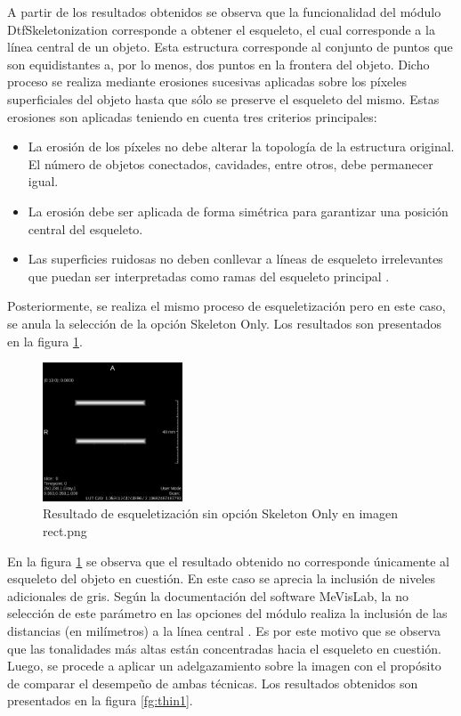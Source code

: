 \documentclass{article}
\begin{document}
A partir de los resultados obtenidos se observa que la funcionalidad del m\'{o}dulo DtfSkeletonization corresponde a obtener el esqueleto, el cual corresponde a la l\'{i}nea central de un objeto. Esta estructura corresponde al conjunto de puntos que son equidistantes a, por lo menos, dos puntos en la frontera del objeto. Dicho proceso se realiza mediante erosiones sucesivas aplicadas sobre los p\'{i}xeles superficiales del objeto hasta que s\'{o}lo se preserve el esqueleto del mismo. Estas erosiones son aplicadas teniendo en cuenta tres criterios principales:
\begin{itemize}
    \item La erosi\'{o}n de los p\'{i}xeles no debe alterar la topolog\'{i}a de la estructura original. El n\'{u}mero de objetos conectados, cavidades, entre otros, debe permanecer igual.
    \item La erosi\'{o}n debe ser aplicada de forma sim\'{e}trica para garantizar una posici\'{o}n central del esqueleto.
    \item Las superficies ruidosas no deben conllevar a l\'{i}neas de esqueleto irrelevantes que puedan ser interpretadas como ramas del esqueleto principal \cite{esqueleto}.
\end{itemize}
Posteriormente, se realiza el mismo proceso de esqueletizaci\'{o}n pero en este caso, se anula la selecci\'{o}n de la opci\'{o}n Skeleton Only. Los resultados son presentados en la figura \ref{fg:notonly1}.

\begin{figure}[ht]
\begin{center}
\includegraphics[width=0.37\textwidth]{3Esqueleto/3_skelet_notonly1} %
\caption{Resultado de esqueletizaci\'{o}n sin opci\'{o}n Skeleton Only en imagen rect.png}
\label{fg:notonly1}
\end{center}
\end{figure}
\FloatBarrier

En la figura \ref{fg:notonly1} se observa que el resultado obtenido no corresponde \'{u}nicamente al esqueleto del objeto en cuesti\'{o}n. En este caso se aprecia la inclusi\'{o}n de niveles adicionales de gris. Seg\'{u}n la documentaci\'{o}n del software MeVisLab, la no selecci\'{o}n de este par\'{a}metro en las opciones del m\'{o}dulo realiza la inclusi\'{o}n de las distancias (en mil\'{i}metros) a la l\'{i}nea central \cite{esqueletoMevis}. Es por este motivo que se observa que las tonalidades m\'{a}s altas est\'{a}n concentradas hacia el esqueleto en cuesti\'{o}n. Luego, se procede a aplicar un adelgazamiento sobre la imagen con el prop\'{o}sito de comparar el desempe\~{u}o de ambas t\'{e}cnicas. Los resultados obtenidos son presentados en la figura \ref{fg:thin1}.
\end{document}

